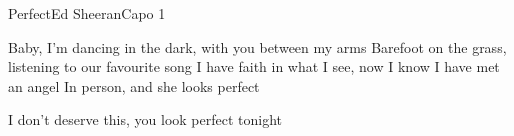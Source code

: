 \begin{song}{Perfect}{Ed Sheeran}{Capo 1}

Baby, I'm dancing in the dark, with you between my arms
Barefoot on the grass, listening to our favourite song
I have faith in what I see, now I know I have met an angel
In person, and she looks perfect

I don't deserve this, you look perfect tonight

\end{song}
